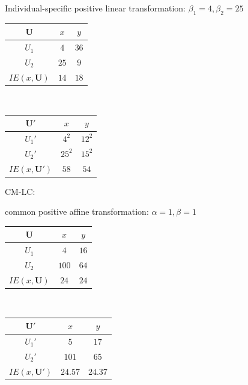 \documentclass[a4paper]{article}
\begin{document}
Individual-specific positive linear transformation: $\beta_1=4,\beta_2=25$
\begin{table}[!htbp]
    \centering
    \begin{tabular}{c|cc|}
        $\mathbf{U}$ & $x$ & $y$              \\ 
        \hline
        $U_1$        & $4$ & $36$ \\
        $U_2$        & $25$ & $9$ \\
        \hline
        $IE(x,\mathbf{U})$ & $14$ & $18$ \\
    \end{tabular}
    $\qquad\qquad$
    \begin{tabular}{c|cc|}
        $\mathbf{U'}$ & $x$ & $y$              \\ 
        \hline
        $U_1'$        & $4^2$ & $12^2$ \\
        $U_2'$        & $25^2$ & $15^2$ \\
        \hline
        $IE(x,\mathbf{U}')$ & $58$ & $54$ \\
    \end{tabular}
\end{table}

CM-LC:

common positive affine transformation: $\alpha=1, \beta=1$
\begin{table}[!htbp]
    \centering
    \begin{tabular}{c|cc|}
        $\mathbf{U}$ & $x$ & $y$              \\ 
        \hline
        $U_1$        & $4$ & $16$ \\
        $U_2$        & $100$ & $64$ \\
        \hline
        $IE(x,\mathbf{U})$ & $24$ & $24$ \\
    \end{tabular}
    $\qquad\qquad$
    \begin{tabular}{c|cc|}
        $\mathbf{U'}$ & $x$ & $y$              \\ 
        \hline
        $U_1'$        & $5$ & $17$ \\
        $U_2'$        & $101$ & $65$ \\
        \hline
        $IE(x,\mathbf{U}')$ & $24.57$ & $24.37$ \\
    \end{tabular}
\end{table}
\end{document}

